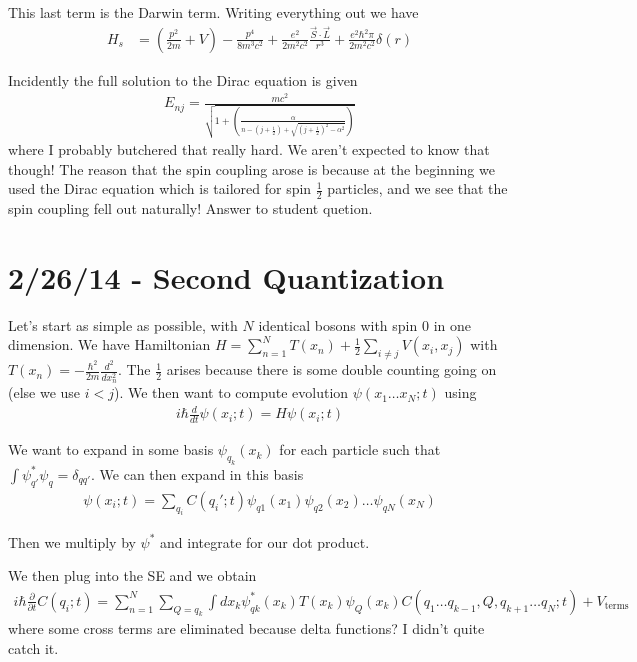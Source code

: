 \documentclass[10pt]{report}
\newcommand{\rd}[2]{\frac{d#1}{d#2}}
\newcommand{\pd}[2]{\frac{\partial #1}{\partial#2}}
\newcommand{\rtd}[2]{\frac{d^2#1}{d#2^2}}
\begin{document}
This last term is the Darwin term. Writing everything out we have
\begin{align}
    H_s &= \left( \frac{p^2}{2m} + V \right) - \frac{p^4}{8m^3c^2} + \frac{e^2}{2m^2c^2}\frac{\vec{S}\cdot \vec{L}}{r^3} + \frac{e^2\hbar^2 \pi}{2m^2c^2}\delta(r)
\end{align}

Incidently the full solution to the Dirac equation is given
\begin{align}
    E_{nj} = \frac{mc^2}{\sqrt{1 + \left( \frac{\alpha}{n - \left( j + \frac{1}{2} \right) + \sqrt{\left( j+\frac{1}{2} \right)^2 - \alpha^2}} \right)}}
\end{align}
where I probably butchered that really hard. We aren't expected to know that though! The reason that the spin coupling arose is because at the beginning we used the Dirac equation which is tailored for spin $\frac{1}{2}$ particles, and we see that the spin coupling fell out naturally! Answer to student quetion.

\chapter{2/26/14 - Second Quantization}

Let's start as simple as possible, with $N$ identical bosons with spin $0$ in one dimension. We have Hamiltonian $H = \sum_{n=1}^{N}T(x_n) + \frac{1}{2}\sum_{i \neq j}^{}V(x_i, x_j)$ with $T(x_n) = -\frac{\hbar^2}{2m}\rtd{}{x_n}$. The $\frac{1}{2}$ arises because there is some double counting going on (else we use $i < j$). We then want to compute evolution $\psi(x_1\dots x_N; t)$ using
\begin{align}
    i\hbar\rd{}{t}\psi(x_i; t) = H\psi(x_i;t)
\end{align}

We want to expand in some basis $\psi_{q_k}(x_k)$ for each particle such that $\int \psi^*_{q'}\psi_q = \delta_{qq'}$. We can then expand in this basis
\begin{align}
    \psi(x_i;t) = \sum_{q_i}C(q_i';t) \psi_{q1}(x_1)\psi_{q2}(x_2)\dots \psi_{qN}(x_N)
\end{align}

Then we multiply by $\psi^*$ and integrate for our dot product.

We then plug into the SE and we obtain
\begin{align}
    i\hbar\pd{}{t}C(q_i; t) = \sum_{n=1}^{N}\sum_{Q = q_k}\int dx_k \psi^*_{qk}(x_k) T(x_k) \psi_Q(x_k) C(q_1\dots q_{k-1},Q, q_{k+1}\dots q_N;t) + V_{\text{terms}}
\end{align}
where some cross terms are eliminated because delta functions? I didn't quite catch it.
\end{document}
